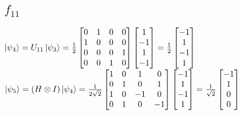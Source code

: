 \documentclass{iansnotes}
\begin{document}
\subsection{$f_{11}$}
$\ket{\psi_4} = U_{11} \ket{\psi_3} = \frac{1}{2}\begin{bmatrix} 0 & 1 & 0 & 0 \\ 1 & 0 & 0 & 0 \\ 0 & 0 & 0 & 1 \\ 0 & 0 & 1 & 0 \end{bmatrix}\begin{bmatrix} 1 \\ -1 \\ 1 \\ -1 \end{bmatrix} = \frac{1}{2}\begin{bmatrix} -1 \\ 1 \\ -1 \\ 1 \end{bmatrix}$\\[12mm]
\noindent$\ket{\psi_5} = (H \otimes I) \ket{\psi_4} = \frac{1}{2\sqrt{2}} \begin{bmatrix} 1 & 0 & 1 & 0 \\ 0 & 1 & 0 & 1 \\ 1 & 0 & -1 & 0 \\ 0 & 1 & 0 & -1 \end{bmatrix} \begin{bmatrix} -1 \\ 1 \\ -1 \\ 1 \end{bmatrix} = \frac{1}{\sqrt{2}} \begin{bmatrix} -1 \\ 1 \\ 0 \\ 0 \end{bmatrix}$\\[20mm]
\end{document}

